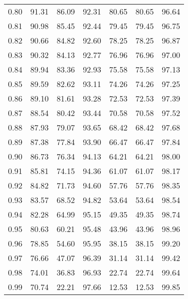 \begin{tabular}{|c|c|c|c|c|c|c|}
      0.80 &     91.31 &     86.09 &      92.31 &   80.65 &      80.65 &         96.64 \\
      0.81 &     90.98 &     85.45 &      92.44 &   79.45 &      79.45 &         96.75 \\
      0.82 &     90.66 &     84.82 &      92.60 &   78.25 &      78.25 &         96.87 \\
      0.83 &     90.32 &     84.13 &      92.77 &   76.96 &      76.96 &         97.00 \\
      0.84 &     89.94 &     83.36 &      92.93 &   75.58 &      75.58 &         97.13 \\
      0.85 &     89.59 &     82.62 &      93.11 &   74.26 &      74.26 &         97.25 \\
      0.86 &     89.10 &     81.61 &      93.28 &   72.53 &      72.53 &         97.39 \\
      0.87 &     88.54 &     80.42 &      93.44 &   70.58 &      70.58 &         97.52 \\
      0.88 &     87.93 &     79.07 &      93.65 &   68.42 &      68.42 &         97.68 \\
      0.89 &     87.38 &     77.84 &      93.90 &   66.47 &      66.47 &         97.84 \\
      0.90 &     86.73 &     76.34 &      94.13 &   64.21 &      64.21 &         98.00 \\
      0.91 &     85.81 &     74.15 &      94.36 &   61.07 &      61.07 &         98.17 \\
      0.92 &     84.82 &     71.73 &      94.60 &   57.76 &      57.76 &         98.35 \\
      0.93 &     83.57 &     68.52 &      94.82 &   53.64 &      53.64 &         98.54 \\
      0.94 &     82.28 &     64.99 &      95.15 &   49.35 &      49.35 &         98.74 \\
      0.95 &     80.63 &     60.21 &      95.48 &   43.96 &      43.96 &         98.96 \\
      0.96 &     78.85 &     54.60 &      95.95 &   38.15 &      38.15 &         99.20 \\
      0.97 &     76.66 &     47.07 &      96.39 &   31.14 &      31.14 &         99.42 \\
      0.98 &     74.01 &     36.83 &      96.93 &   22.74 &      22.74 &         99.64 \\
      0.99 &     70.74 &     22.21 &      97.66 &   12.53 &      12.53 &         99.85 \\
\bottomrule
\end{tabular}
